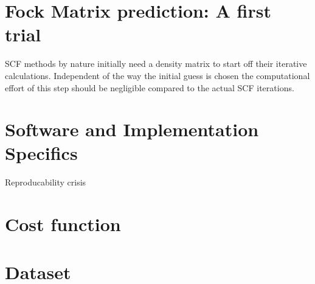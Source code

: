 \section{Fock Matrix prediction: A first trial}
\label{sec:first_predictions}
SCF methods by nature initially need a density matrix to start off their iterative calculations. Independent of the way the initial guess is chosen the computational effort of this step should be negligible compared to the actual SCF iterations. 


\subsection{}

\section{Software and Implementation Specifics}
\label{sec:software_and_implementation}
Reproducability crisis
\section{Cost function}
\section{Dataset}